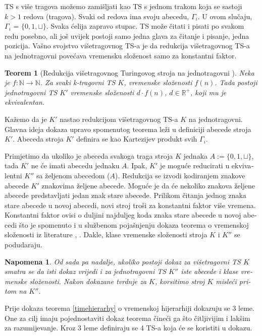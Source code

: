 \documentclass[12pt]{rectors}
\newtheorem{theorem}{Teorem}[section]
\newtheorem{remark}{Napomena}[section]
\begin{document}
\begin{otherlanguage}{croatian}
TS s više tragova možemo zamišljati kao TS s jednom trakom koja se sastoji $k > 1$ redova (tragova). Svaki od redova
ima svoju abecedu, $\Gamma_i$. U ovom slučaju, $\Gamma_i$ = $\{0,1, \sqcup\}$. 
Svaka ćelija zapravo stupac.
TS može čitati i pisati po svakom redu posebno, ali još uvijek postoji samo jedna glava za čitanje i pisanje, jedna pozicija.
Vašno svojstvo višetragovnog TS-a je da redukcija višetragovnog TS-a na jednotragovni povećava vremensku složenost samo  za konstantni faktor.
\begin{theorem}[Redukcija višetragovnog Turingovog stroja na jednotragovni \cite{sipser2006_2,hart1968}]
Neka je $f:\mathbb{N} \to \mathbb{N}$.
Za svaki k-tragovni TS $K$, vremenske složenosti $f(n)$. Tada postoji jednotragovni TS $K'$ vremenske složenosti $d\cdot f(n)$, $d \in \mathbb{R^+}$, koji mu je ekvivalentan.
\end{theorem}

Kažemo da je $K'$ nastao redukcijom višetragovnog TS-a $K$ na jednotragovni.
Glavna ideja dokaza upravo spomenutog teorema leži u definiciji abecede stroja $K'$. Abeceda stroja $K'$ definira se kao Kartezijev produkt svih $\Gamma_i$.

Primjetimo da ukoliko je abeceda svakoga traga stroja $K$ jednaka $A:=\{0,1,\sqcup\}$, tada 
$K'$ ne će imati abecedu jednaku $A$.
Ipak, $K'$ je moguće reducirati u ekvivalentni $K''$ sa željenom abecedom ($A$).
Redukcija se izvodi
kodiranjem znakove abecede $K'$ znakovima željene abecede.
Moguće je da će nekoliko znakova željene abecede predstavljati jedan znak stare abecede.
Prilikom čitanja jednog znaka stare abecede u novoj abecedi, novi stroj troši za konstantni faktor više vremena. Konstantni faktor ovisi o duljini najduljeg koda znaka stare abecede u novoj abecedi što je spomenuto i u službenom pojašnjenju dokaza teorema o vremenskoj složenosti iz literature \cite{sipser2006},
\cite{SipserErrata}.
Dakle, klase vremenske složenosti stroja $K$
i $K''$ se podudaraju.

\begin{remark}
Od sada pa nadalje, ukoliko postoji dokaz za višetragovni TS $K$ smatra
se da isti dokaz vrijedi i za jednotragovni TS $K''$ iste abecede i klase vremenske složenosti.
Nakon dokazane tvrdnje za $K$, korsitimo stroj $K$ misleći pritom na $K''$.
\end{remark}

Prije dokaza teorema \ref{timehierarhy} o vremenskoj hijerarhiji dokazuju se 3 leme. One za cilj imaju
pojednostaviti dokaz teorema čineći ga što čitljivijim i lakšim za razumijevanje.
Kroz 3 leme definiraju se 4 TS-a koja će se koristiti u dokazu.


\end{otherlanguage}
\end{document}
